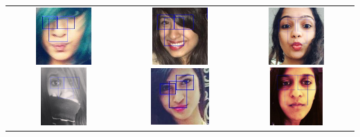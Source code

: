 \begin{table}[ht!]
\begin{center}
\begin{tabular}{c|c|c}
\includegraphics[height=2.2cm,width=2.2cm]{figures/results/detections/india/female/lq/74f643a5-514a-4e92-b147-773e0be8ba78.jpeg}
\includegraphics[height=2.2cm,width=2.2cm]{figures/results/detections/india/female/lq/14a21a35-4bba-4051-b91e-646f88eb9acd.jpeg}
&
\includegraphics[height=2.2cm,width=2.2cm]{figures/results/detections/india/female/mq/cf395cd4-547a-481d-9c0d-953a14549f01.jpeg}
\includegraphics[height=2.2cm,width=2.2cm]{figures/results/detections/india/female/mq/87d904ba-098a-4a1d-8b61-85694dbdae95.jpeg}
&
\includegraphics[height=2.2cm,width=2.2cm]{figures/results/detections/india/female/hq/9855e182-7d75-4cb7-81d7-4f0edd1046d5.jpeg}
\includegraphics[height=2.2cm,width=2.2cm]{figures/results/detections/india/female/hq/ce8a7718-685f-4e26-8b66-5ee4d3111d6e.jpeg}
\TBstrut \\ 



\end{tabular}
\end{center}
\end{table}
